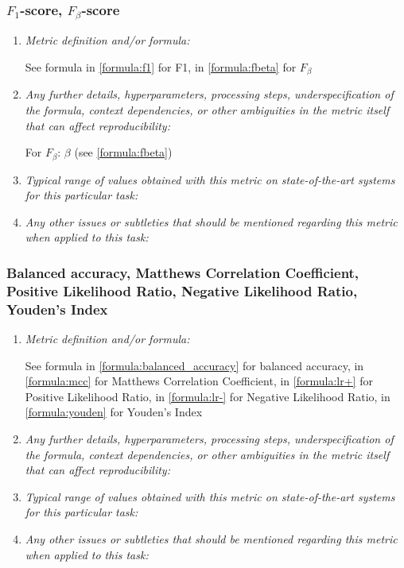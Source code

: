 \documentclass[a4paper,11pt]{article}
\begin{document}
        \subsubsection{$F_1$-score, $F_\beta$-score}
            \begin{enumerate}[label=\alph*.]
                \item \textit{Metric definition and/or formula:}

                See formula in \ref{formula:f1} for F1, in \ref{formula:fbeta} for $F_\beta$
                \bigskip
                \item \textit{Any further details, hyperparameters, processing steps, underspecification of the formula, context dependencies, or other ambiguities in the metric itself that can affect reproducibility:}

                For $F_\beta$: $\beta$ (see \ref{formula:fbeta})
                \bigskip
                \item \textit{Typical range of values obtained with this metric on state-of-the-art systems for this particular task:}
                \bigskip
                \item \textit{Any other issues or subtleties that should be mentioned regarding this metric when applied to this task:}
                \bigskip
            \end{enumerate}
        \subsubsection{Balanced accuracy, Matthews Correlation Coefficient, Positive Likelihood Ratio, Negative Likelihood Ratio, Youden's Index}
            \begin{enumerate}[label=\alph*.]
                \item \textit{Metric definition and/or formula:}

                See formula in \ref{formula:balanced_accuracy} for balanced accuracy, in \ref{formula:mcc} for Matthews Correlation Coefficient, in \ref{formula:lr+} for Positive Likelihood Ratio, in \ref{formula:lr-} for Negative Likelihood Ratio, in \ref{formula:youden} for Youden's Index
                \bigskip
                \item \textit{Any further details, hyperparameters, processing steps, underspecification of the formula, context dependencies, or other ambiguities in the metric itself that can affect reproducibility:}
                \bigskip
                \item \textit{Typical range of values obtained with this metric on state-of-the-art systems for this particular task:}
                \bigskip
                \item \textit{Any other issues or subtleties that should be mentioned regarding this metric when applied to this task:}
                \bigskip
            \end{enumerate}
\end{document}
